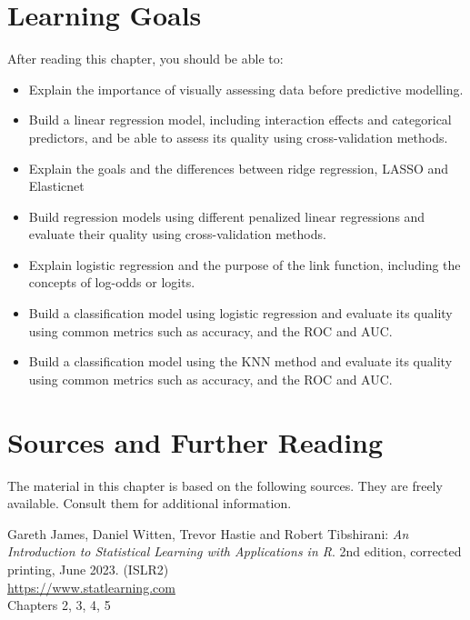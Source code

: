 %
%
\section*{Learning Goals}

After reading this chapter, you should be able to:
\begin{itemize}
   \item Explain the importance of visually assessing data before predictive modelling.
   \item Build a linear regression model, including interaction effects and categorical predictors, and be able to assess its quality using cross-validation methods.
   \item Explain the goals and the differences between ridge regression, LASSO and Elasticnet
   \item Build regression models using different penalized linear regressions and evaluate their quality using cross-validation methods.
   \item Explain logistic regression and the purpose of the link function, including the concepts of log-odds or logits.
   \item Build a classification model using logistic regression and evaluate its quality using common metrics such as accuracy, and the ROC and AUC.
   \item Build a classification model using the KNN method and evaluate its quality using common metrics such as accuracy, and the ROC and AUC.
\end{itemize}

\section*{Sources and Further Reading}

The material in this chapter is based on the following sources. They are freely available. Consult them for additional information.

\begin{tcolorbox}[colback=alert]
Gareth James, Daniel Witten, Trevor Hastie and Robert Tibshirani: \emph{An Introduction to Statistical Learning with Applications in R}. 2nd edition, corrected printing, June 2023. (ISLR2) \\
\vspace{1mm}
\url{https://www.statlearning.com} \\
\vspace{1mm}
Chapters 2, 3, 4, 5
\end{tcolorbox}

